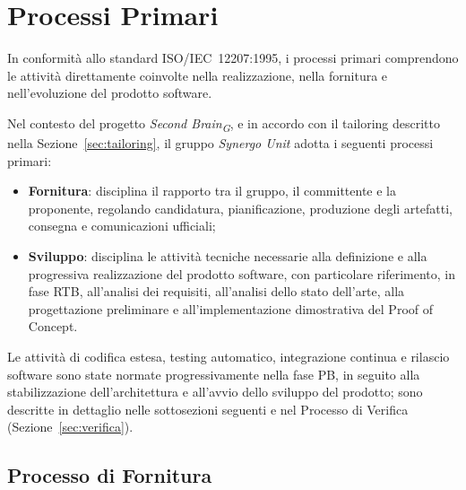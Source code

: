 
\section{Processi Primari}
\label{sec:processi-primari}

In conformità allo standard ISO/IEC~12207:1995, i processi primari
comprendono le attività direttamente coinvolte nella realizzazione, nella fornitura
e nell'evoluzione del prodotto software.

Nel contesto del progetto \textit{Second Brain\textsubscript{G}}, e in accordo con il tailoring
descritto nella Sezione~\ref{sec:tailoring}, il gruppo \textit{Synergo Unit} adotta
i seguenti processi primari:

\begin{itemize}
    \item \textbf{Fornitura}: disciplina il rapporto tra il gruppo, il committente e
    la proponente, regolando candidatura, pianificazione, produzione degli
    artefatti, consegna e comunicazioni ufficiali;

    \item \textbf{Sviluppo}: disciplina le attività tecniche necessarie alla
    definizione e alla progressiva realizzazione del prodotto software, con
    particolare riferimento, in fase RTB, all'analisi dei requisiti,
    all'analisi dello stato dell'arte, alla progettazione preliminare e all'implementazione dimostrativa del Proof of Concept.
\end{itemize}

Le attività di codifica estesa, testing automatico, integrazione continua e
rilascio software sono state normate progressivamente nella fase PB, in
seguito alla stabilizzazione dell'architettura e all'avvio dello sviluppo
del prodotto; sono descritte in dettaglio nelle sottosezioni seguenti e nel
Processo di Verifica (Sezione~\ref{sec:verifica}).


\subsection{Processo di Fornitura}
\label{sec:fornitura}

